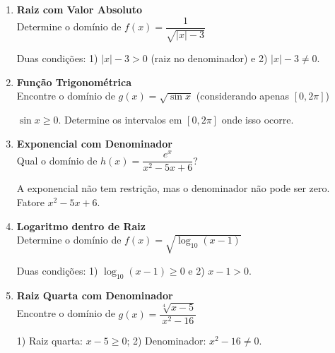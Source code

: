 \documentclass[11pt]{article}
\begin{document}
\begin{multicols}{2}
\begin{enumerate}
\item \textbf{Raiz com Valor Absoluto}\\
Determine o domínio de $f(x) = \dfrac{1}{\sqrt{|x|-3}}$
\begin{tcolorbox}[colback=explanationbg,colframe=titleblue,title=Dica:]
Duas condições: 1) $|x|-3 > 0$ (raiz no denominador) e 2) $|x|-3 \neq 0$.
\end{tcolorbox}

\item \textbf{Função Trigonométrica}\\
Encontre o domínio de $g(x) = \sqrt{\sin x}$ (considerando apenas $[0,2\pi]$)
\begin{tcolorbox}[colback=explanationbg,colframe=titleblue,title=Dica:]
$\sin x \geq 0$. Determine os intervalos em $[0,2\pi]$ onde isso ocorre.
\end{tcolorbox}

\item \textbf{Exponencial com Denominador}\\
Qual o domínio de $h(x) = \dfrac{e^x}{x^2-5x+6}$?
\begin{tcolorbox}[colback=explanationbg,colframe=titleblue,title=Dica:]
A exponencial não tem restrição, mas o denominador não pode ser zero. Fatore $x^2-5x+6$.
\end{tcolorbox}

\item \textbf{Logaritmo dentro de Raiz}\\
Determine o domínio de $f(x) = \sqrt{\log_{10}(x-1)}$
\begin{tcolorbox}[colback=explanationbg,colframe=titleblue,title=Dica:]
Duas condições: 1) $\log_{10}(x-1) \geq 0$ e 2) $x-1 > 0$.
\end{tcolorbox}

\item \textbf{Raiz Quarta com Denominador}\\
Encontre o domínio de $g(x) = \dfrac{\sqrt[4]{x-5}}{x^2-16}$
\begin{tcolorbox}[colback=explanationbg,colframe=titleblue,title=Dica:]
1) Raiz quarta: $x-5 \geq 0$; 2) Denominador: $x^2-16 \neq 0$.
\end{tcolorbox}

\end{enumerate}
\end{multicols}
\end{document}
